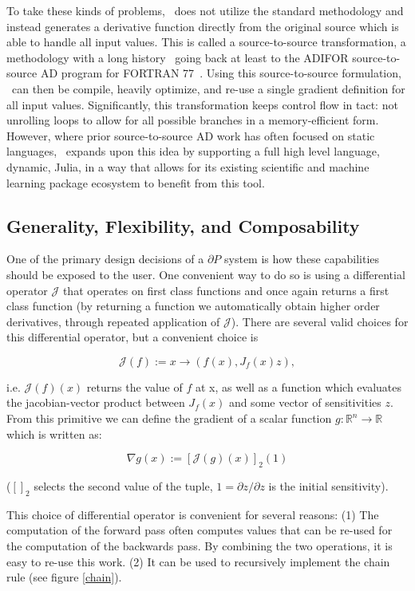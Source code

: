 \documentclass{juliacon}
\newcommand{\Zygote}{\iftoggle{anonymous}{$\partial$P.jl}{Zygote}}
\begin{document}
    To take these kinds of problems, \Zygote\ does not utilize the standard methodology and instead generates a derivative function directly from the original source which is able to handle all input values. This is  called a source-to-source transformation, a methodology with a long history~\cite{baydin2018automatic} going back at least to the ADIFOR source-to-source AD program for FORTRAN 77~\cite{adifor}. Using this source-to-source formulation, \Zygote\ can then be compile, heavily optimize, and re-use a single gradient definition for all input values. Significantly, this transformation keeps control flow in tact: not unrolling loops to allow for all possible branches in a memory-efficient form. However, where prior source-to-source AD work has often focused on static languages, \Zygote\ expands upon this idea by supporting a full high level language, dynamic, Julia, in a way that allows for its existing scientific and machine learning package ecosystem to benefit from this tool. 

\subsection{Generality, Flexibility, and Composability}

    One of the primary design decisions of a $\partial P$ system is how these capabilities should be exposed to the user. One convenient way to do so is using a differential operator $\mathcal{J}$ that operates on first class functions and once again returns a first class function (by returning a function we automatically obtain higher order derivatives, through repeated application of $\mathcal{J}$). There are several valid choices for this differential operator, but a convenient choice is

\[
    \mathcal{J}(f) := x \to (f(x), J_f(x)z),
\]

i.e. $\mathcal{J}(f)(x)$ returns the value of $f$ at x, as well as a function which evaluates the jacobian-vector product between $J_f(x)$ and some vector of sensitivities $z$. From this primitive we can define the gradient of a scalar function $g: \mathbb{R}^n \to \mathbb{R}$ which is written as:

\[
    \nabla g(x) := \left[\mathcal{J}(g)(x)\right]_2(1)
\]

    ($[]_2$ selects the second value of the tuple, $1 = \partial z / \partial z$ is the initial sensitivity).

    This choice of differential operator is convenient for several reasons: (1) The computation of the forward pass often computes values that can be re-used for the computation of the backwards pass. By combining the two operations, it is easy to re-use this work. (2) It can be used to recursively implement the chain rule (see figure \ref{chain}).
\end{document}
